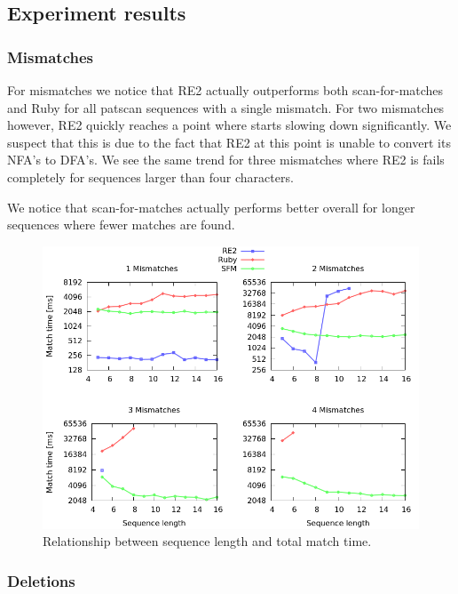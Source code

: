 \documentclass[12pt]{article}
\theoremstyle{definition}
\begin{document}
\newpage

\subsection{Experiment results}

\subsubsection{Mismatches}

For mismatches we notice that RE2 actually outperforms both scan-for-matches and Ruby for all patscan sequences with a single mismatch. For two mismatches however, RE2 quickly reaches a point where starts slowing down significantly. We suspect that this is due to the fact that RE2 at this point is unable to convert its NFA's to DFA's. We see the same trend for three mismatches where RE2 is fails completely for sequences larger than four characters.

We notice that scan-for-matches actually performs better overall for longer sequences where fewer matches are found.

\begin{figure}[H]
	\begin{center}
		\includegraphics[scale=0.55]{graphs/seq_length_mismatches.png}	
	\end{center}
	\caption{Relationship between sequence length and total match time.}
	\label{graph:cases:mismatches}
\end{figure}

\subsubsection{Deletions}
\end{document}
